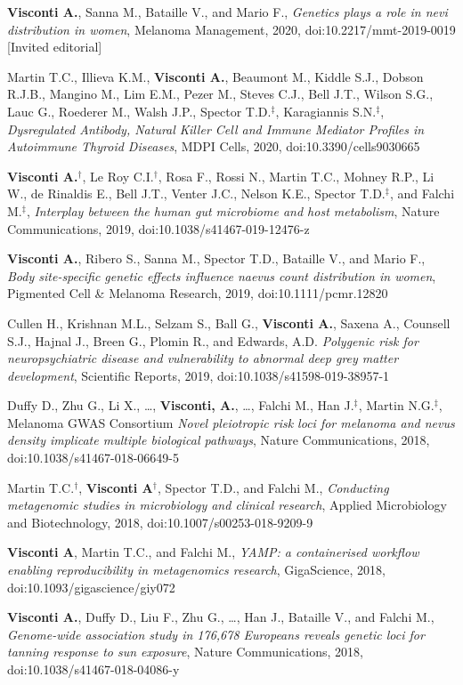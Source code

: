 \documentclass[a4paper,10pt]{article}
\begin{document}
{\begin{itemize}
		 \textbf{Visconti A.}, Sanna M., Bataille V., and Mario F., \emph{Genetics plays a role in nevi distribution in women}, Melanoma Management, 2020, doi:10.2217/mmt-2019-0019 [Invited editorial]

		 Martin T.C., Illieva K.M., \textbf{Visconti A.}, Beaumont M., Kiddle S.J., Dobson R.J.B., Mangino M., Lim E.M., Pezer M., Steves C.J., Bell J.T., Wilson S.G., Lauc G., Roederer M., Walsh J.P., Spector T.D.$^{\textbf{$\ddag $}}$, Karagiannis S.N.$^{\textbf{$\ddag $}}$, \emph{Dysregulated Antibody, Natural Killer Cell and Immune Mediator Profiles in Autoimmune Thyroid Diseases}, MDPI Cells, 2020, doi:10.3390/cells9030665

		 \textbf{Visconti A.}$^{\textbf{$\dag $}}$, Le Roy C.I.$^{\textbf{$\dag $}}$, Rosa F., Rossi N., Martin T.C., Mohney R.P., Li W., de Rinaldis E., Bell J.T., Venter J.C., Nelson K.E., Spector T.D.$^{\textbf{$\ddag $}}$, and Falchi M.$^{\textbf{$\ddag $}}$, \emph{Interplay between the human gut microbiome and host metabolism}, Nature Communications, 2019, doi:10.1038/s41467-019-12476-z

		 \textbf{Visconti A.}, Ribero S., Sanna M., Spector T.D., Bataille V., and Mario F., \emph{Body site-specific genetic effects influence naevus count distribution in women}, Pigmented Cell \& Melanoma Research, 2019, doi:10.1111/pcmr.12820

		 Cullen H., Krishnan M.L., Selzam S., Ball G., \textbf{Visconti A.}, Saxena A., Counsell S.J., Hajnal J., Breen G., Plomin R., and Edwards, A.D. \emph{Polygenic risk for neuropsychiatric disease and vulnerability to abnormal deep grey matter development}, Scientific Reports, 2019, doi:10.1038/s41598-019-38957-1

		 Duffy D., Zhu G., Li X., \dots, \textbf{Visconti, A.}, \dots, Falchi M., Han J.$^{\textbf{$\ddag $}}$, Martin N.G.$^{\textbf{$\ddag $}}$, Melanoma GWAS Consortium \emph{Novel pleiotropic risk loci for melanoma and nevus density implicate multiple biological pathways}, Nature Communications, 2018, doi:10.1038/s41467-018-06649-5

		 Martin T.C.$^{\textbf{$\dag $}}$, \textbf{Visconti A}$^{\textbf{$\dag $}}$, Spector T.D., and Falchi M., \emph{Conducting metagenomic studies in microbiology and clinical research}, Applied Microbiology and Biotechnology, 2018, doi:10.1007/s00253-018-9209-9

		 \textbf{Visconti A}, Martin T.C., and Falchi M., \emph{YAMP: a containerised workflow enabling reproducibility in metagenomics research}, GigaScience, 2018, doi:10.1093/gigascience/giy072

		  \textbf{Visconti A.}, Duffy D., Liu F., Zhu G., \dots, Han J., Bataille V., and Falchi M., \emph{Genome-wide association study in 176,678 Europeans reveals genetic loci for tanning response to sun exposure}, Nature Communications, 2018, doi:10.1038/s41467-018-04086-y


	\end{itemize}
}
\end{document}
